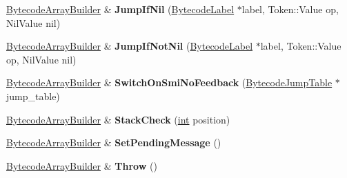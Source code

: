 \begin{DoxyCompactItemize}
\mbox{\hyperlink{classv8_1_1internal_1_1interpreter_1_1BytecodeArrayBuilder}{Bytecode\+Array\+Builder}} \& {\bfseries Jump\+If\+Nil} (\mbox{\hyperlink{classv8_1_1internal_1_1interpreter_1_1BytecodeLabel}{Bytecode\+Label}} $\ast$label, Token\+::\+Value op, Nil\+Value nil)
\item 
\mbox{\label{classv8_1_1internal_1_1interpreter_1_1BytecodeArrayBuilder_a327158ef67ec77f182f2de093f4c134d}} 
\mbox{\hyperlink{classv8_1_1internal_1_1interpreter_1_1BytecodeArrayBuilder}{Bytecode\+Array\+Builder}} \& {\bfseries Jump\+If\+Not\+Nil} (\mbox{\hyperlink{classv8_1_1internal_1_1interpreter_1_1BytecodeLabel}{Bytecode\+Label}} $\ast$label, Token\+::\+Value op, Nil\+Value nil)
\item 
\mbox{\label{classv8_1_1internal_1_1interpreter_1_1BytecodeArrayBuilder_a7751af7b7347700b471c75062a5f85b4}} 
\mbox{\hyperlink{classv8_1_1internal_1_1interpreter_1_1BytecodeArrayBuilder}{Bytecode\+Array\+Builder}} \& {\bfseries Switch\+On\+Smi\+No\+Feedback} (\mbox{\hyperlink{classv8_1_1internal_1_1interpreter_1_1BytecodeJumpTable}{Bytecode\+Jump\+Table}} $\ast$jump\+\_\+table)
\item 
\mbox{\label{classv8_1_1internal_1_1interpreter_1_1BytecodeArrayBuilder_a98bd128fa8da46a0819c2e8066e6ce12}} 
\mbox{\hyperlink{classv8_1_1internal_1_1interpreter_1_1BytecodeArrayBuilder}{Bytecode\+Array\+Builder}} \& {\bfseries Stack\+Check} (\mbox{\hyperlink{classint}{int}} position)
\item 
\mbox{\label{classv8_1_1internal_1_1interpreter_1_1BytecodeArrayBuilder_a8d8b505393a6838e773559f5fcad2ae6}} 
\mbox{\hyperlink{classv8_1_1internal_1_1interpreter_1_1BytecodeArrayBuilder}{Bytecode\+Array\+Builder}} \& {\bfseries Set\+Pending\+Message} ()
\item 
\mbox{\label{classv8_1_1internal_1_1interpreter_1_1BytecodeArrayBuilder_ae40f8bc5d629ea0d05035a68e4e579d4}} 
\mbox{\hyperlink{classv8_1_1internal_1_1interpreter_1_1BytecodeArrayBuilder}{Bytecode\+Array\+Builder}} \& {\bfseries Throw} ()
\item 

\end{DoxyCompactItemize}
